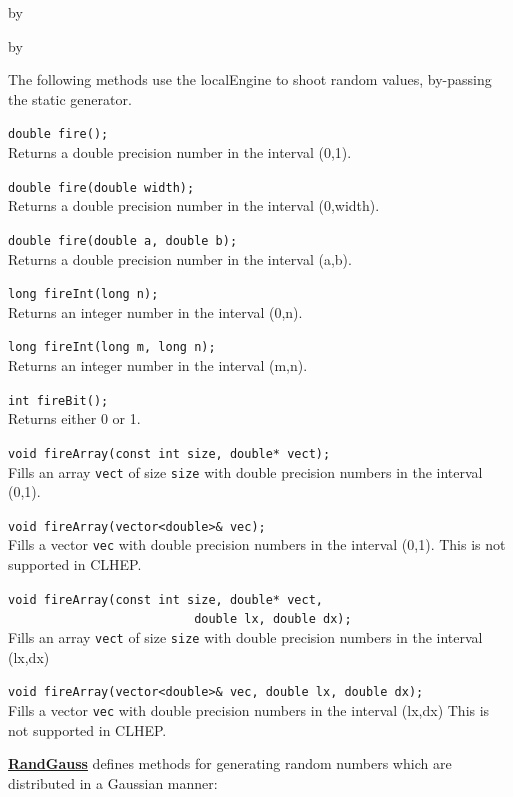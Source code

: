 \documentclass[twoside]{article}
\newcommand{\comp}[1]{\texttt{#1}}%
\newcommand{\entrylabel}[1]{\mbox{\textbf{{#1}}}\hfil}%
\newenvironment{entry}
{\begin{list}{}%
    {\renewcommand{\makelabel}{\entrylabel}%
     \setlength{\labelwidth}{90pt}%
     \setlength{\leftmargin}{\labelwidth}
     \advance\leftmargin by \labelsep%
      }%
    }%
  {\end{list}}
\newcommand{\Entrylabel}[1]%
{\raisebox{0pt}[1ex][0pt]{\makebox[\labelwidth][l]%
    {\parbox[t]{\labelwidth}{\hspace{0pt}\textbf{{#1}}}}}}
\newenvironment{Entry}%
{\renewcommand{\entrylabel}{\Entrylabel}\begin{entry}}%
  {\end{entry}}
\begin{document}
\begin{description}
\begin{Entry}
\begin{Entry}
  The following methods use the localEngine to shoot random values,
  by-passing the static generator.

   \verb+double fire();+\\
   Returns a double precision number in the interval (0,1).
  
   \verb+double fire(double width);+\\
   Returns a double precision number in the interval (0,width).
   
   \verb+double fire(double a, double b);+\\
   Returns a double precision number in the interval (a,b).

   \verb+long fireInt(long n);+\\
   Returns an integer number in the interval (0,n).
  
   \verb+long fireInt(long m, long n);+\\
   Returns an integer number in the interval (m,n).

   \verb+int fireBit();+\\
   Returns either 0 or 1.
  
   \verb+void fireArray(const int size, double* vect);+\\
   Fills an array \comp{vect} of size \comp{size} with double
   precision numbers in the interval (0,1).

   \verb+void fireArray(vector<double>& vec);+\\
   Fills a vector \comp{vec} with double
   precision numbers in the interval (0,1).
   This is not supported in CLHEP.
   
   \verb+void fireArray(const int size, double* vect,+\\
   \verb+                          double lx, double dx);+\\
   Fills an array \comp{vect} of size \comp{size} with double
   precision numbers in the interval (lx,dx)

   \verb+void fireArray(vector<double>& vec, double lx, double dx);+\\
   Fills a vector \comp{vec} with double
   precision numbers in the interval (lx,dx)
   This is not supported in CLHEP.
   
   \begin{description}
     \item \underline{\bf RandGauss}  defines methods for generating random
      numbers which are distributed in a Gaussian manner:
   \end{description}
   

\end{Entry}
\end{Entry}
\end{description}
\end{document}
